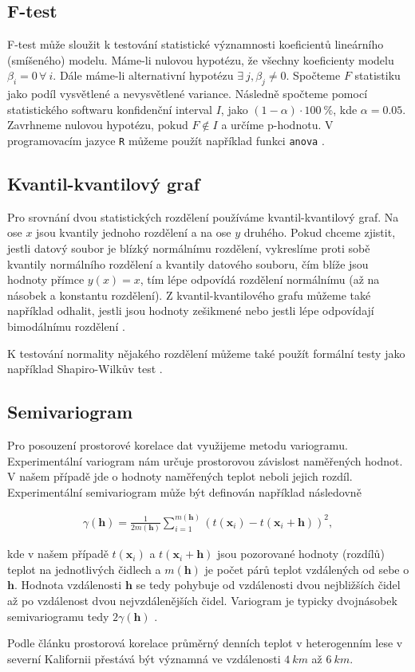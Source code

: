 \subsection{F-test}
F-test může sloužit k testování statistické významnosti koeficientů lineárního (smíšeného) modelu. Máme-li nulovou hypotézu, že všechny koeficienty modelu $\beta_i = 0\, \forall\ i$. Dále máme-li alternativní hypotézu $\exists\ j, \beta_j\neq 0$. Spočteme $F$ statistiku jako podíl vysvětlené a nevysvětlené variance. Následně spočteme pomocí statistického softwaru konfidenční interval $I$, jako $(1-\alpha)\cdot\SI{100}{\%}$, kde $\alpha = 0.05$. Zavrhneme nulovou hypotézu, pokud $F\notin I$ a určíme p-hodnotu. V programovacím jazyce \texttt{R} můžeme použít například funkci \texttt{anova} \parencite{ftest}.

\subsection{Kvantil-kvantilový graf}
Pro srovnání dvou statistických rozdělení používáme kvantil-kvantilový graf. Na ose $x$ jsou kvantily jednoho rozdělení a na ose $y$ druhého. Pokud chceme zjistit, jestli datový soubor je blízký normálnímu rozdělení, vykreslíme proti sobě kvantily normálního rozdělení a kvantily datového souboru, čím blíže jsou hodnoty přímce $y(x)=x$, tím lépe odpovídá rozdělení normálnímu (až na násobek a konstantu rozdělení). Z kvantil-kvantilového grafu můžeme také například odhalit, jestli jsou hodnoty zešikmené nebo jestli lépe odpovídají bimodálnímu rozdělení \parencite{interpretqqplot}.

K testování normality nějakého rozdělení můžeme také použít formální testy jako například Shapiro-Wilkův test \parencite{KozakM2018WnaR}.%

\subsection{Semivariogram}\label{chap:variogram}
Pro posouzení prostorové korelace dat využijeme metodu variogramu. Experimentální variogram nám určuje prostorovou závislost naměřených hodnot. V našem případě jde o hodnoty naměřených teplot neboli jejich rozdíl. Experimentální semivariogram může být definován například následovně

\begin{gather*}
	\gamma(\mathbf{h}) = \frac{1}{2m(\mathbf{h})}\sum_{i=1}^{m(\mathbf{h})}\left(t(\mathbf{x}_i) - t(\mathbf{x}_i+\mathbf{h})\right)^2,
\end{gather*}

kde v našem případě $t(\mathbf{x}_i)$ a $t(\mathbf{x}_i+\mathbf{h})$ jsou pozorované hodnoty (rozdílů) teplot na jednotlivých čidlech a $m(\mathbf{h})$ je počet párů teplot vzdálených od sebe o $\mathbf{h}$. Hodnota vzdálenosti $\mathbf{h}$ se tedy pohybuje od vzdálenosti dvou nejbližších čidel až po vzdálenost dvou nejvzdálenějších čidel. Variogram je typicky dvojnásobek semivariogramu tedy $2\gamma(\mathbf{h})$ \parencite{variogram}.

Podle článku \parencite{predictingforestmicroclimate} prostorová korelace průměrný denních teplot v heterogenním lese v severní Kalifornii přestává být významná ve vzdálenosti $\SI{4}{km}$ až $\SI{6}{km}$.
